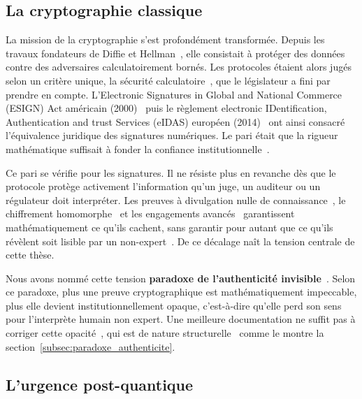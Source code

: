 \begin{sloppypar}

\subsection{La cryptographie classique}

La mission de la cryptographie s'est profond\'ement transform\'ee. Depuis les
travaux fondateurs de Diffie et Hellman~\cite{DiffieHellman76}, elle consistait
\`a prot\'eger des donn\'ees contre des adversaires calculatoirement born\'es.
Les protocoles \'etaient alors jug\'es selon un crit\`ere unique, la
s\'ecurit\'e calculatoire~\cite{GoldwasserMicali84,Goldreich01}, que le
l\'egislateur a fini par prendre en compte. L'Electronic Signatures in Global and National Commerce (ESIGN) Act
am\'ericain (2000)~\cite{ESIGN00} puis le r\`eglement electronic IDentification, Authentication and trust Services (eIDAS) europ\'een
(2014)~\cite{eIDAS14} ont ainsi consacr\'e l'\'equivalence juridique des signatures
num\'eriques. Le pari \'etait que la rigueur math\'ematique suffisait \`a fonder la
confiance institutionnelle~\cite{Kerr04,Mason07}.

Ce pari se v\'erifie pour les signatures. Il ne r\'esiste plus en revanche d\`es
que le protocole prot\`ege activement l'information qu'un juge, un auditeur ou un
r\'egulateur doit interpr\'eter. Les preuves \`a divulgation nulle de connaissance~\cite{GMR85},
le chiffrement homomorphe~\cite{Gentry09,BrakerskiVaikuntanathan11} et les engagements avanc\'es~\cite{Pedersen91}
garantissent math\'ematiquement ce qu'ils cachent, sans garantir pour autant que
ce qu'ils r\'ev\`elent soit lisible par un non-expert~\cite{Bonneau12,Herley09}. De ce
d\'ecalage na\^it la tension centrale de cette th\`ese.

Nous avons nomm\'e cette tension \textbf{paradoxe de l'authenticit\'e invisible}~\cite{MINKA2026CLO}. Selon ce paradoxe, plus une preuve cryptographique est math\'ematiquement
impeccable, plus elle devient institutionnellement opaque, c'est-\`a-dire qu'elle perd son sens pour l'interpr\`ete humain non expert. Une meilleure documentation ne suffit pas \`a corriger cette opacit\'e~\cite{Whitten99,Adams1999}, qui est de nature structurelle~\cite{Barredo2020,Adadi2018} comme le montre la section~\ref{subsec:paradoxe_authenticite}.

\subsection{L'urgence post-quantique}


\end{sloppypar}

